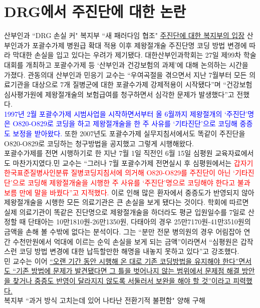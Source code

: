 \section{DRG에서 주진단에 대한 논란}
\begin{hemphsentense}{산부인과 ``DRG 손실 커" 복지부 ``새 패러다임 협조"}
\href{https://dailymedi.com/news/view.html?section=1&category=5&no=771918}{주진단에 대한 복지부의 입장}
산부인과가 포괄수가제 병원급 확대 적용 이후 제왕절개술 주진단명 코딩 방법 변경에 따라 막대한 손실을 입고 있다는 우려가 제기됐다.
대한산부인과학회는 27일 제99차 학술대회를 개최하고 포괄수가제 등 ‘산부인과 건강보험의 과제’에 대해 논의하는 시간을 가졌다. 관동의대 산부인과 민응기 교수는 “우여곡절을 겪으면서 지난 7월부터 모든 의료기관을 대상으로 7개 질병군에 대한 포괄수가제 강제적용이 시작됐다”며 “건강보험심사평가원에 제왕절개술의 보험급여를 청구하면서 심각한 문제가 발생했다”고 전했다.\\
\textcolor{blue}{1997년 2월 포괄수가제 시범사업을 시작하면서부터 올 6월까지 제왕절개의 ‘주진단’명은 O820-O829로 코딩을 하고 제왕절개술을 한 주 사유를 `기타진단’으로 코딩해 중증도 보정을 받아왔다.} 또한 2007년도 포괄수가제 실무지침서에서도 똑같이 주진단을 O820-O829로 코딩하는 청구방법을 공지했고 그렇게 시행해왔다.\\
포괄수가제를 전면 시행하기로 한 지난 7월 1일 직전인 6월 15일 심평원 교육자료에서도 마찬가지였다.민 교수는 “그러나 7월 포괄수가제 전면실시 후 심평원에서는 \textcolor{red}{갑자기 한국표준질병사인분류 질병코딩지침서에 의거해 O820-O829를 주진단이 아닌 ‘기타진단’으로 코딩해 제왕절개술을 시행한 주 사유를 ‘주진단’명으로 코딩해야 한다고 불과 보름 만에 말을 바꿨다”고 지적했다.} 이로 인해 많은 환자에서 중증도가 반영되지 않아 제왕절개술을 시행한 모든 의료기관은 큰 손실을 보게 됐다는 것이다. 학회에 따르면 실제 의료기관이 똑같은 진단명으로 제왕절개술을 하더라도 평균 입원일수를 7일로 산정할 때 단태아는 10만1810원-26만1350원, 다태아의 경우 25만7170원-41만3510원의 금액을 손해 볼 수밖에 없다는 분석이다. 그는 “분만 전문 병의원의 경우 어림잡아 연간 수천만원에서 억대에 이르는 순익 손실을 보게 되는 금액”이라면서 “심평원은 갑작스런 코딩 방법 변경에 대한 납득할만한 해명을 내놓지 못하고 있다”고 강조했다.\\
민 교수는 이어 \uline{“오랜 기간 동안 시행해 온 대로 기존 코딩방법을 유지해야 한다”면서도 “기존 방법에 문제가 발견됐다면 그 틀을 벗어나지 않는 범위에서 문제점 해결 방안을 찾거나 중증도 반영이 달라지지 않도록 서둘러서 보완을 해야 할 것”이라고 피력했다.}\\
복지부 ``과거 방식 고치는데 있어 나타난 전환기적 불편함" 양해 구해\\

\end{hemphsentense}
